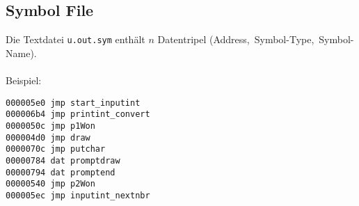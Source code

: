 \subsection{Symbol File}

\begin{frame}[fragile]{\insertsubsection}
    Die Textdatei \texttt{u.out.sym} enthält $n$ Datentripel (Address,~Symbol-Type,~Symbol-Name).
    \\~\\
    Beispiel:
\begin{verbatim}
000005e0 jmp start_inputint
000006b4 jmp printint_convert
0000050c jmp p1Won
000004d0 jmp draw
0000070c jmp putchar
00000784 dat promptdraw
00000794 dat promptend
00000540 jmp p2Won
000005ec jmp inputint_nextnbr
\end{verbatim}
\end{frame}
